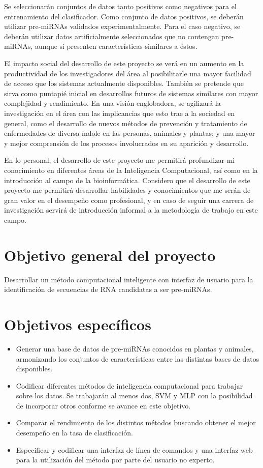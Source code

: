 \documentclass[12pt,bibliography=oldstyle,DIV=12,parskip=full-,titlepage]{scrartcl}
\begin{document}
Se seleccionarán conjuntos de datos tanto positivos como negativos
para el entrenamiento del clasificador. Como conjunto de datos
positivos, se deberán utilizar pre-miRNAs validados experimentalmente.
Para el caso negativo, se deberán utilizar datos artificialmente
seleccionados que no contengan pre-miRNAs, aunque sí presenten
características similares a éstos.

El impacto social del desarrollo de este proyecto se verá en un
aumento en la productividad de los investigadores del área al
posibilitarle una mayor facilidad de acceso que los sistemas actualmente
disponibles. También se pretende que sirva como puntapié inicial en
desarrollos futuros de sistemas similares con mayor complejidad y
rendimiento. En una visión englobadora, se agilizará la investigación
en el área con las implicancias que esto trae a la sociedad en
general, como el desarrollo de nuevos métodos de prevención y
tratamiento de enfermedades de diversa índole en las personas,
animales y plantas; y una mayor y mejor comprensión de los procesos
involucrados en su aparición y desarrollo.

En lo personal, el desarrollo de este proyecto me permitirá
profundizar mi conocimiento en diferentes áreas de la Inteligencia
Computacional, así como en la introducción al campo de la
bioinformática. Considero que el desarrollo de este proyecto me
permitirá desarrollar habilidades y conocimientos que me serán de gran
valor en el desempeño como profesional, y en caso de seguir una
carrera de investigación servirá de introducción informal a la
metodología de trabajo en este campo.
%
%
\newpage
\section{Objetivo general del proyecto}
Desarrollar un método computacional inteligente con interfaz de
usuario para la identificación de secuencias de RNA candidatas a ser
pre-miRNAs.
\section{Objetivos específicos}
\begin{itemize}
\item Generar una base de datos de pre-miRNAs conocidos en plantas y
  animales, armonizando los conjuntos de características entre las
  distintas bases de datos disponibles.
\item Codificar diferentes métodos de inteligencia computacional para
  trabajar sobre los datos. Se trabajarán al menos dos, SVM y MLP con
  la posibilidad de incorporar otros conforme se avance en este
  objetivo.
\item Comparar el rendimiento de los distintos métodos buscando
  obtener el mejor desempeño en la tasa de clasificación.
\item Especificar y codificar una interfaz de línea de comandos y una
  interfaz web para la utilización del método por parte del usuario no
  experto.
\end{itemize}
%
%
\end{document}
